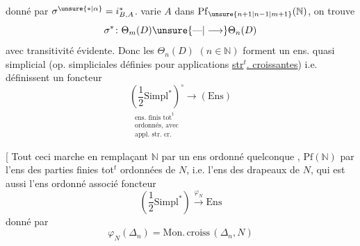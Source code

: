 donné par $\sigma^{\unsure{\ast|\alpha}}=i_{B,A}^{\ast}$.  varie $A$ dans $\mathrm{Pf}_{\unsure{n+1|n-1|m+1}}(\mathbb N)$, on trouve
\[ \sigma^{\ast}\colon \Theta_m(D)\unsure{\text{---}|\longrightarrow}\Theta_n(D) \]
avec transitivité évidente. Donc les $\Theta_n(D)$ $(n\in\mathbb N)$ forment un ens. quasi simplicial (op. simpliciales définies pour applications \uline{str$^{t}$. croissantes}) i.e. définissent un foncteur
\[ \underset{\substack{\text{ens. finis tot}^{\mathrm t}\\\text{ordonnés, avec}\\\text{appl. str. cr.}}}{\left(\frac12\mathrm{Simpl}^{\ast}\right)^{\circ}}\longrightarrow(\mathrm{Ens}) \]

[ Tout ceci marche en remplaçant $\mathbb N$ par un ens ordonné quelconque , $\mathrm{Pf}(\mathbb N)$ par l'ens  des parties finies tot$^{t}$ ordonnées de $N$, i.e. l'ens des drapeaux de $N$, qui est aussi l'ens ordonné associé   foncteur
\[ \left(\frac12\mathrm{Simpl}^{\ast}\right)\xrightarrow{\varphi_N}\mathrm{Ens} \]
donné par
\[ \varphi_N(\Delta_n)=\mathrm{Mon.}\,\mathrm{croiss}\,(\Delta_n,N) \]
